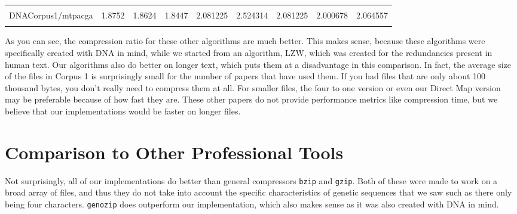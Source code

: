 \documentclass[12pt,twoside]{reedthesis}
\begin{document}
\begin{table}[!h]
{\begin{tabular}[t]{lrrrrrrrr}
\cellcolor{gray!6}{DNACorpus1/mpomtcg} & \cellcolor{gray!6}{1.9378} & \cellcolor{gray!6}{1.9058} & \cellcolor{gray!6}{1.8768} & \cellcolor{gray!6}{2.172671} & \cellcolor{gray!6}{2.485925} & \cellcolor{gray!6}{2.172671} & \cellcolor{gray!6}{2.000375} & \cellcolor{gray!6}{2.053449}\\
DNACorpus1/mtpacga & 1.8752 & 1.8624 & 1.8447 & 2.081225 & 2.524314 & 2.081225 & 2.000678 & 2.064557\\
\addlinespace
\cellcolor{gray!6}{DNACorpus1/vaccg} & \cellcolor{gray!6}{1.7614} & \cellcolor{gray!6}{1.7614} & \cellcolor{gray!6}{1.7649} & \cellcolor{gray!6}{2.108805} & \cellcolor{gray!6}{2.413347} & \cellcolor{gray!6}{2.108805} & \cellcolor{gray!6}{2.000365} & \cellcolor{gray!6}{2.065162}\\
\bottomrule
\end{tabular}}
\end{table}
As you can see, the compression ratio for these other algorithms are much better. This makes sense, because these algorithms were specifically created with DNA in mind, while we started from an algorithm, LZW, which was created for the redundancies present in human text. Our algorithms also do better on longer text, which puts them at a disadvantage in this comparison. In fact, the average size of the files in Corpus 1 is surprisingly small for the number of papers that have used them. If you had files that are only about 100 thousand bytes, you don't really need to compress them at all. For smaller files, the four to one version or even our Direct Map version may be preferable because of how fast they are. These other papers do not provide performance metrics like compression time, but we believe that our implementations would be faster on longer files.

\hypertarget{comparison-to-other-professional-tools}{%
\section{Comparison to Other Professional Tools}\label{comparison-to-other-professional-tools}}

Not surprisingly, all of our implementations do better than general compressors \texttt{bzip} and \texttt{gzip}. Both of these were made to work on a broad array of files, and thus they do not take into account the specific characteristics of genetic sequences that we saw such as there only being four characters. \texttt{genozip} does outperform our implementation, which also makes sense as it was also created with DNA in mind.
\end{document}
